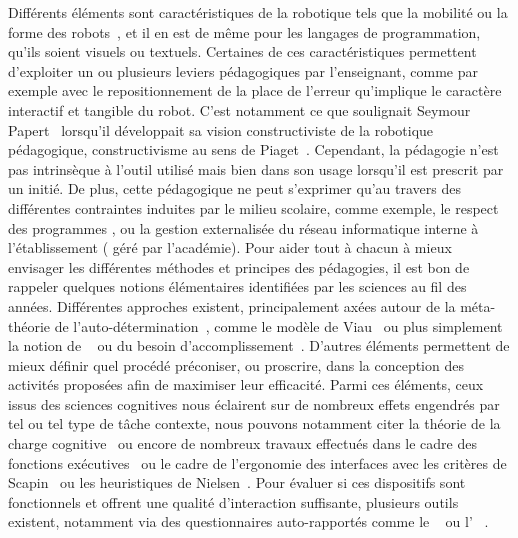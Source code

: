     Différents éléments sont caractéristiques de la robotique tels que la mobilité ou la forme des robots~, et il en est de même pour les langages de programmation, qu'ils soient visuels ou textuels. Certaines de ces caractéristiques permettent d'exploiter un ou plusieurs leviers pédagogiques par l'enseignant, comme par exemple avec le repositionnement de la place de l'erreur qu'implique le caractère interactif et tangible du robot. C'est notamment ce que soulignait Seymour Papert~ lorsqu'il développait sa vision constructiviste de la robotique pédagogique, constructivisme au sens de Piaget~. Cependant, la pédagogie n'est pas intrinsèque à l'outil utilisé mais bien dans son usage lorsqu'il est prescrit par un initié. De plus, cette pédagogique ne peut s'exprimer qu'au travers des différentes contraintes induites par le milieu scolaire, comme exemple, le respect des programmes , ou la gestion externalisée du réseau informatique interne à l'établissement (\cf {} géré par l'académie).
    Pour aider tout à chacun à mieux envisager les différentes méthodes et principes des pédagogies, il est bon de rappeler quelques notions élémentaires identifiées par les sciences au fil des années. 
    Différentes approches existent, principalement axées autour de la méta-théorie de l'auto-détermination~, comme le modèle de Viau~ ou plus simplement la notion de ~ ou du besoin d'accomplissement~. D'autres éléments permettent de mieux définir quel procédé préconiser, ou proscrire, dans la conception des activités proposées afin de maximiser leur efficacité. Parmi ces éléments, ceux issus des sciences cognitives nous éclairent sur de nombreux effets  engendrés par tel ou tel type de tâche \etou contexte, nous pouvons notamment citer la théorie de la charge cognitive~ ou encore de nombreux travaux effectués dans le cadre des fonctions exécutives~ ou le cadre de l'ergonomie des interfaces avec les critères de Scapin~ ou les heuristiques de Nielsen~.
    Pour évaluer si ces dispositifs sont fonctionnels et offrent une qualité d'interaction suffisante, plusieurs outils existent, notamment via des questionnaires auto-rapportés comme le ~  ou l'~ . 
